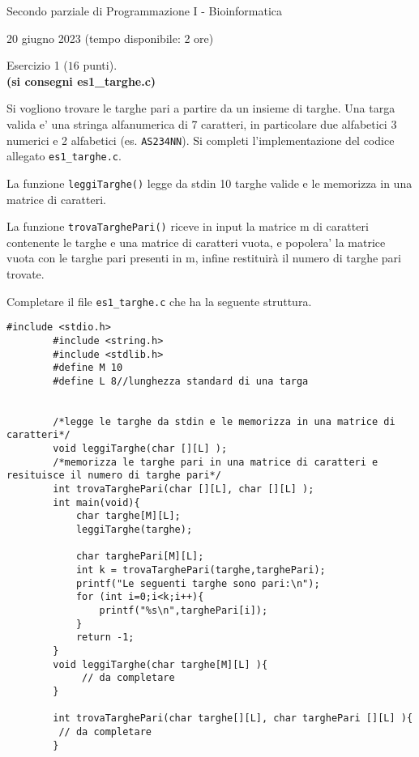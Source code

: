\documentclass[12pt]{article}
\begin{document}
	\begin{center}{\LARGE Secondo parziale di Programmazione I - Bioinformatica}\\
		\begin{center}
			\large 20 giugno 2023 (tempo disponibile: 2 ore)
		\end{center}
	\end{center}
	
	\newpage
		\begin{center}
			{\Large Esercizio 1} ($16$ punti).
			\\
			\textbf{(si consegni {es1\_targhe.c})}
	\end{center}

	

Si vogliono trovare le targhe pari a partire da un insieme di targhe.
Una targa valida e' una stringa alfanumerica di 7 caratteri, in particolare due alfabetici 3 numerici e 2 alfabetici (es. \texttt{AS234NN}). 
Si completi l'implementazione del codice allegato \texttt{es1\_targhe.c}.

La funzione \texttt{leggiTarghe()} legge da stdin 10 targhe valide e le memorizza in una matrice di caratteri.

La funzione \texttt{trovaTarghePari()} riceve in input la matrice m di caratteri contenente le targhe e una matrice di caratteri vuota, e popolera' la matrice vuota con le targhe pari presenti in m, infine restituirà il numero di targhe pari trovate. 

	Completare il file \texttt{es1\_targhe.c} che ha la seguente struttura.

		\begin{lstlisting}[language=myC]
		#include <stdio.h>
		#include <string.h>
		#include <stdlib.h>
		#define M 10
		#define L 8//lunghezza standard di una targa
		
		
		/*legge le targhe da stdin e le memorizza in una matrice di caratteri*/
		void leggiTarghe(char [][L] );
		/*memorizza le targhe pari in una matrice di caratteri e resituisce il numero di targhe pari*/
		int trovaTarghePari(char [][L], char [][L] );
		int main(void){
			char targhe[M][L];
			leggiTarghe(targhe);
			
			char targhePari[M][L];	
			int k = trovaTarghePari(targhe,targhePari);
			printf("Le seguenti targhe sono pari:\n");
			for (int i=0;i<k;i++){
				printf("%s\n",targhePari[i]);
			}
			return -1;
		}
		void leggiTarghe(char targhe[M][L] ){
			 // da completare	
		}
		
		int trovaTarghePari(char targhe[][L], char targhePari [][L] ){
  		 // da completare	
		}	
		
		\end{lstlisting}
\end{document}

